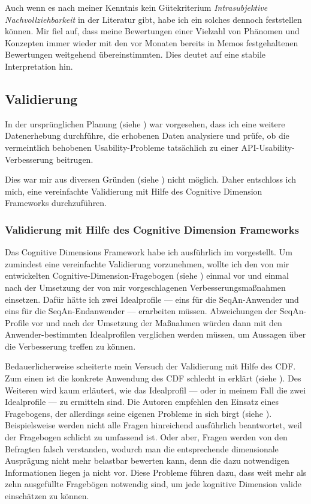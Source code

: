 Auch wenn es nach meiner Kenntnis kein Gütekriterium \textit{Intrasubjektive Nachvollziehbarkeit} in der Literatur gibt, habe ich ein solches dennoch feststellen können. Mir fiel auf, dass meine Bewertungen einer Vielzahl von Phänomen und Konzepten immer wieder mit den vor Monaten bereits in Memos festgehaltenen Bewertungen weitgehend übereinstimmten. Dies deutet auf eine stabile Interpretation hin.




\subsection{Validierung}

In der ursprünglichen Planung (siehe ) war vorgesehen, dass ich eine weitere Datenerhebung durchführe, die erhobenen Daten analysiere und prüfe, ob die vermeintlich behobenen Usability-Probleme tatsächlich zu einer API-Usability-Verbesserung beitrugen.

Dies war mir aus diversen Gründen (siehe ) nicht möglich. Daher entschloss ich mich, eine vereinfachte Validierung mit Hilfe des Cognitive Dimension Frameworks durchzuführen.

\subsubsection{Validierung mit Hilfe des Cognitive Dimension Frameworks}
\label{sec:cdf-validation-difficulties}

Das Cognitive Dimensions Framework habe ich ausführlich im  vorgestellt. Um zumindest eine vereinfachte Validierung vorzunehmen, wollte ich den von mir entwickelten Cognitive-Dimension-Fragebogen (siehe ) einmal vor und einmal nach der Umsetzung der von mir vorgeschlagenen Verbesserungsmaßnahmen einsetzen. Dafür hätte ich zwei Idealprofile --- eins für die SeqAn-Anwender und eins für die SeqAn-Endanwender --- erarbeiten müssen. Abweichungen der SeqAn-Profile vor und nach der Umsetzung der Maßnahmen würden dann mit den Anwender-bestimmten Idealprofilen verglichen werden müssen, um Aussagen über die Verbesserung treffen zu können.

Bedauerlicherweise scheiterte mein Versuch der Validierung mit Hilfe des CDF. Zum einen ist die konkrete Anwendung des CDF schlecht in \cite{AnIntroductiontot:1996ux} erklärt (siehe ). Des Weiteren wird kaum erläutert, wie das Idealprofil --- oder in meinem Fall die zwei Idealprofile --- zu ermitteln sind. Die Autoren empfehlen den Einsatz eines Fragebogens, der allerdings seine eigenen Probleme in sich birgt (siehe ). Beispielsweise werden nicht alle Fragen hinreichend ausführlich beantwortet, weil der Fragebogen schlicht zu umfassend ist. Oder aber, Fragen werden von den Befragten falsch verstanden, wodurch man die entsprechende dimensionale Ausprägung nicht mehr belastbar bewerten kann, denn die dazu notwendigen Informationen liegen ja nicht vor. Diese Probleme führen dazu, dass weit mehr als zehn ausgefüllte Fragebögen notwendig sind, um jede kognitive Dimension valide einschätzen zu können.


